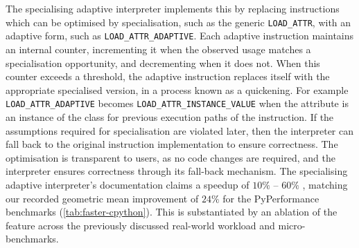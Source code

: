 The specialising adaptive interpreter implements this by replacing instructions which can be optimised by specialisation, such as the generic \texttt{LOAD\_ATTR}, with an adaptive form, such as \texttt{LOAD\_ATTR\_ADAPTIVE}. Each adaptive instruction maintains an internal counter, incrementing it when the observed usage matches a specialisation opportunity, and decrementing when it does not. When this counter exceeds a threshold, the adaptive instruction replaces itself with the appropriate specialised version, in a process known as a quickening. For example \texttt{LOAD\_ATTR\_ADAPTIVE} becomes \texttt{LOAD\_ATTR\_INSTANCE\_VALUE} when the attribute is an instance of the class for previous execution paths of the instruction.
If the assumptions required for specialisation are violated later, then the interpreter can fall back to the original instruction implementation to ensure correctness.
The optimisation is transparent to users, as no code changes are required, and the interpreter ensures correctness through its fall-back mechanism.
The specialising adaptive interpreter's documentation claims a speedup of $10\%$ -- $60\%$ \cite{pep659}, matching our recorded geometric mean improvement of $24\%$ for the PyPerformance benchmarks (\autoref{tab:faster-cpython}).
This is substantiated by an ablation of the feature across the previously discussed real-world workload and micro-benchmarks.


